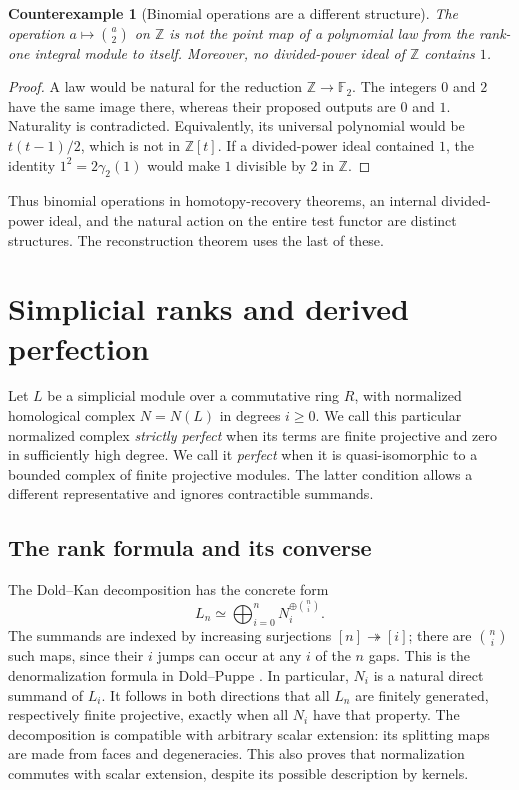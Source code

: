 \documentclass[11pt,a4paper]{article}
\newtheorem{counterexample}[theorem]{Counterexample}
\theoremstyle{definition}
\newcommand{\Z}{\mathbb Z}
\newcommand{\F}{\mathbb F}
\begin{document}
\begin{counterexample}[Binomial operations are a different structure]\label{ex:binomial}
The operation $a\mapsto\binom a2$ on $\Z$ is not the point map
of a polynomial law from the rank-one integral module to itself.
Moreover, no divided-power ideal of $\Z$ contains $1$.
\end{counterexample}
\begin{proof}
A law would be natural for the reduction $\Z\to\F_2$. The integers
$0$ and $2$ have the same image there, whereas their proposed outputs
are $0$ and $1$. Naturality is contradicted. Equivalently, its
universal polynomial would be $t(t-1)/2$, which is not in $\Z[t]$.
If a divided-power ideal contained $1$, the identity
$1^2=2\gamma_2(1)$ would make $1$ divisible by $2$ in $\Z$.
\end{proof}
Thus binomial operations in homotopy-recovery theorems, an internal
divided-power ideal, and the natural action on the entire test
functor are distinct structures. The reconstruction theorem uses the
last of these.

\section{Simplicial ranks and derived perfection}\label{sec:perfection}
Let $L$ be a simplicial module over a commutative ring $R$, with
normalized homological complex $N=N(L)$ in degrees $i\ge0$.
We call this particular normalized complex \emph{strictly perfect}
when its terms are finite projective and zero in sufficiently high
degree. We call it \emph{perfect} when it is quasi-isomorphic to a
bounded complex of finite projective modules. The latter condition
allows a different representative and ignores contractible summands.

\subsection{The rank formula and its converse}
The Dold--Kan decomposition has the concrete form
\begin{equation}\label{eq:dold-kan-sum}
 L_n\simeq\bigoplus_{i=0}^n N_i^{\oplus\binom ni}.
\end{equation}
The summands are indexed by increasing surjections $[n]\twoheadrightarrow[i]$;
there are $\binom ni$ such maps, since their $i$ jumps can occur at
any $i$ of the $n$ gaps. This is the denormalization formula in
Dold--Puppe \cite[equation~(3.3), p.~219; Theorem~3.6 and
Corollary~3.8, p.~220]{DoldPuppe}. In particular, $N_i$ is a natural
direct summand of $L_i$. It follows in both directions that all
$L_n$ are finitely generated, respectively finite projective, exactly
when all $N_i$ have that property. The decomposition is compatible
with arbitrary scalar extension: its splitting maps are made from
faces and degeneracies. This also proves that normalization commutes
with scalar extension, despite its possible description by kernels.
\end{document}

